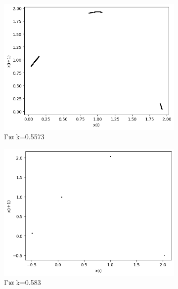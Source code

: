 \begin{figure}[h!]
\begin{subfigure}[b]{0.25\textwidth}
		\includegraphics[width=\textwidth]{LateX images/graphs q03/g11}
		\caption{Για k=0.5573}
		\label{f:k23}
	\end{subfigure}
	\hfill
	\begin{subfigure}[b]{0.25\textwidth}
		\centering
		\includegraphics[width=\textwidth]{LateX images/graphs q03/g12}
		\caption{Για k=0.583}
		\label{f:k24}
	\end{subfigure}
	\hfill
	\begin{subfigure}[b]{0.25\textwidth}
		\centering

\end{subfigure}
\end{figure}
